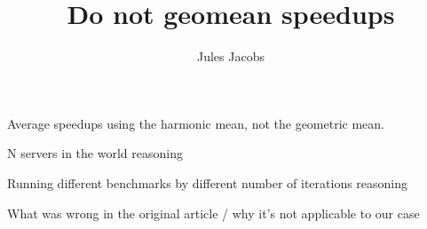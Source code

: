 

\title{Do not geomean speedups}
\author{Jules Jacobs}


\maketitle

Average speedups using the harmonic mean, not the geometric mean.

N servers in the world reasoning

Running different benchmarks by different number of iterations reasoning

What was wrong in the original article / why it's not applicable to our case

